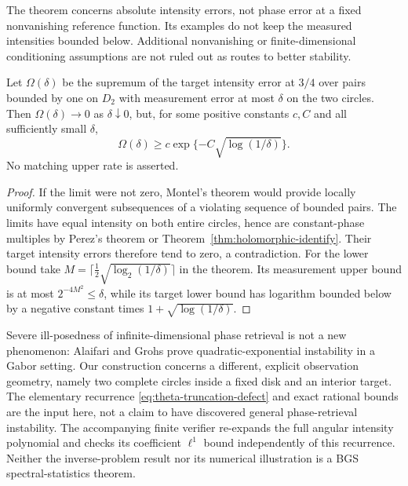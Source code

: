 The theorem concerns absolute intensity errors, not phase error at a fixed
nonvanishing reference function. Its examples do not keep the measured
intensities bounded below. Additional nonvanishing or finite-dimensional
conditioning assumptions are not ruled out as routes to better stability.

\begin{corollary}
Let $\Omega(\delta)$ be the supremum of the target intensity error at $3/4$
over pairs bounded by one on $D_2$ with measurement error at most $\delta$
on the two circles. Then $\Omega(\delta)\to0$ as $\delta\downarrow0$, but,
for some positive constants $c,C$ and all sufficiently small $\delta$,
\[
 \Omega(\delta)\ge c\exp\{-C\sqrt{\log(1/\delta)}\}.
\]
No matching upper rate is asserted.
\end{corollary}
\begin{proof}
If the limit were not zero, Montel's theorem would provide locally uniformly
convergent subsequences of a violating sequence of bounded pairs. The limits
have equal intensity on both entire circles, hence are constant-phase
multiples by Perez's theorem or Theorem~\ref{thm:holomorphic-identify}.
Their target intensity errors therefore tend to zero, a contradiction.
For the lower bound take
$M=\lceil\tfrac12\sqrt{\log_2(1/\delta)}\rceil$ in the theorem. Its
measurement upper bound is at most $2^{-4M^2}\le\delta$, while its target
lower bound has logarithm bounded below by a negative constant times
$1+\sqrt{\log(1/\delta)}$.
\end{proof}

Severe ill-posedness of infinite-dimensional phase retrieval is not a new
phenomenon: Alaifari and Grohs \cite{AG2021} prove quadratic-exponential
instability in a Gabor setting. Our construction concerns a different,
explicit observation geometry, namely two complete circles inside a fixed
disk and an interior target. The elementary recurrence
\eqref{eq:theta-truncation-defect} and exact rational bounds are the input
here, not a claim to have discovered general phase-retrieval instability.
The accompanying finite verifier re-expands the full angular intensity
polynomial and checks its coefficient $\ell^1$ bound independently of this
recurrence. Neither the inverse-problem result nor its numerical illustration
is a BGS spectral-statistics theorem.

